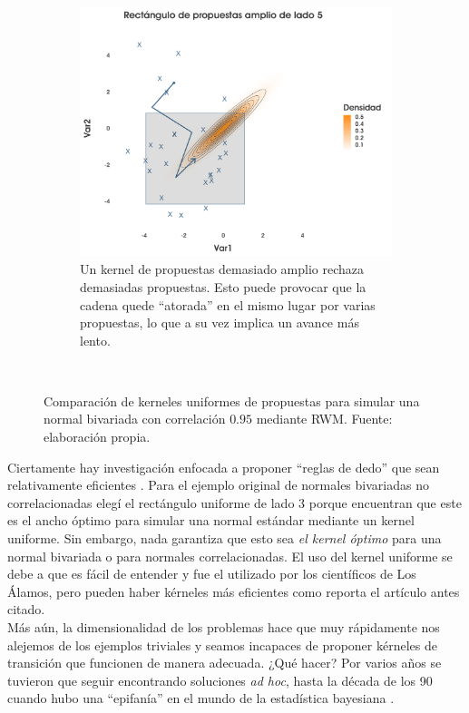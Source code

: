 \begin{figure}[h]
\begin{subfigure}{0.3\textwidth}
    \end{subfigure}
    ~
    \begin{subfigure}{0.3\textwidth}
        \includegraphics[width=\textwidth]{Figs/Bayes/Ejemplo_RWM_Compara3}
        \caption{Un kernel de propuestas demasiado amplio rechaza demasiadas propuestas. Esto puede provocar que la cadena quede ``atorada'' en el mismo lugar por varias propuestas, lo que a su vez implica un avance más lento.}
    \end{subfigure}
    ~
    \caption{Comparación de kerneles uniformes de propuestas para simular una normal bivariada con correlación $0.95$ mediante RWM. Fuente: elaboración propia.}\label{fig:RWM_Corr}
\end{figure}

Ciertamente hay investigación enfocada a proponer ``reglas de dedo'' que sean relativamente eficientes \parencites{GelmanRobertsGilks96,Geyer05,YangRdz13}. Para el ejemplo original de normales bivariadas no correlacionadas elegí el rectángulo uniforme de lado $3$ porque \textcite{YangRdz13} encuentran que este es el ancho óptimo para simular una normal estándar mediante un kernel uniforme. Sin embargo, nada garantiza que esto sea \textit{el kernel óptimo} para una normal bivariada o para normales correlacionadas. El uso del kernel uniforme se debe a que es fácil de entender y fue el utilizado por los científicos de Los Álamos, pero pueden haber kérneles más eficientes como reporta el artículo antes citado.\\ 

 Más aún, la dimensionalidad de los problemas hace que muy rápidamente nos alejemos de los ejemplos triviales y seamos incapaces de proponer kérneles de transición que funcionen de manera adecuada. ¿Qué hacer? Por varios años se tuvieron que seguir encontrando soluciones \textit{ad hoc}, hasta la década de los 90 cuando hubo una ``epifanía'' en el mundo de la estadística bayesiana \parencite{RobertCasella11}. 

